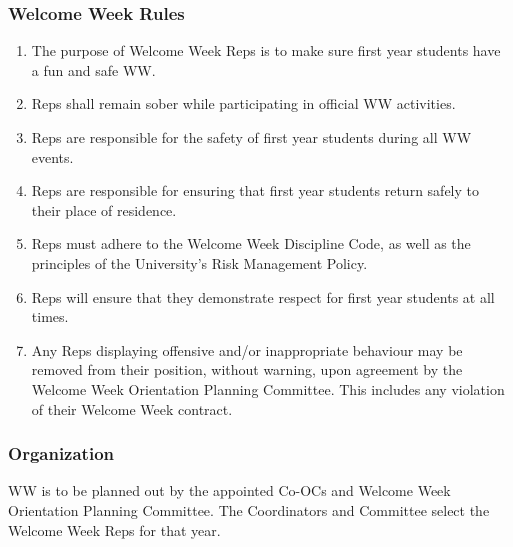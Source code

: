 \hypertarget{welcome-week-rules}{%
 \subsubsection{Welcome Week Rules}
 \label{welcome-week-rules}}
\begin{enumerate}
 \item
  The purpose of Welcome Week Reps is to make sure first year students
  have a fun and safe WW.
 \item
  Reps shall remain sober while participating in official WW activities.
 \item
  Reps are responsible for the safety of first year students during all
  WW events.
 \item
  Reps are responsible for ensuring that first year students return
  safely to their place of residence.
 \item
  Reps must adhere to the Welcome Week Discipline Code, as well as the
  principles of the University's Risk Management Policy.
 \item
  Reps will ensure that they demonstrate respect for first year students
  at all times.
 \item
  Any Reps displaying offensive and/or inappropriate behaviour may be
  removed from their position, without warning, upon agreement by the
  Welcome Week Orientation Planning Committee. This includes any
  violation of their Welcome Week contract.
\end{enumerate}

\hypertarget{organization}{%
 \subsubsection{Organization}
 \label{organization}}
WW is to be planned out by the appointed Co-OCs and Welcome Week
Orientation Planning Committee. The Coordinators and Committee select
the Welcome Week Reps for that year.


